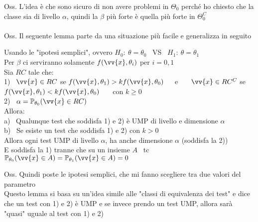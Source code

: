 Oss. L'idea è che sono sicuro di non avere problemi in $\Theta_0$ perché ho chiesto che la classe sia di livello $\alpha$, quindi la $\beta$ più forte è quella più forte in $\Theta_0^C$\\ \\


Oss. Il seguente lemma parte da una situazione più facile e generalizza in seguito

\begin{teo}
     Usando le "ipotesi semplici", ovvero $H_0 : \ \theta=\theta_0$ \ VS \ $H_1: \ \theta=\theta_1$\\
     Per $\beta$ ci serviranno solamente $f(\vv{x},\theta_i)$ per $i=0,1$ \\
     Sia $RC$ tale che:\\
     1) \ $\vv{x}\in RC$ se $f(\vv{x},\theta_1)>kf(\vv{x},\theta_0)$\ \ \ e \ \ \ $\vv{x}\in RC^C$ se $f(\vv{x},\theta_1)<k f(\vv{x},\theta_0)$ \ \ \ con $k\ge0$\\
     2) \ $\alpha = \PP_{\theta_0}(\vv{x}\in RC)$\\
     Allora:\\
     a) \ Qualunque test che soddisfa 1) e 2) è UMP di livello e dimensione $\alpha$\\
     b) \ Se esiste un test che soddisfa 1) e 2) con $k>0$\\
     \phantom{b) \ }Allora ogni test UMP di livello $\alpha$, ha anche dimensione $\alpha$ (soddisfa  la 2))\\
     \phantom{b) \ }E soddisfa la 1) tranne che su un insieme $A$ \ tc \ $\PP_{\theta_0}(\vv{x}\in A)= \PP_{\theta_1}(\vv{x}\in A)=0$
\end{teo}

Oss. Quindi poste le ipotesi semplici,  che mi fanno scegliere tra due valori del parametro\\
Questo lemma si basa su un'idea simile alle "classi di equivalenza dei test" e dice che un test con 1) e 2) è UMP e se invece prendo un test UMP, allora sarà "quasi" uguale al test con 1) e 2)\\ 

